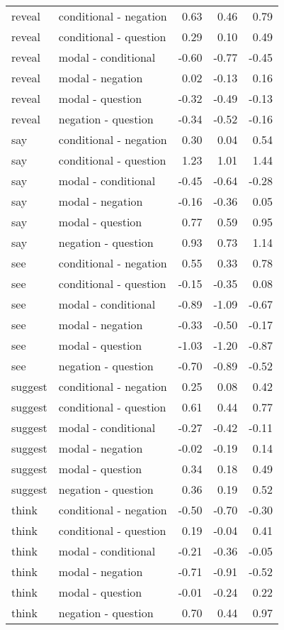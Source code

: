 \documentclass[11pt,fleqn]{article}
\newcommand{\6}{\mbox{$[\hspace*{-.6mm}[$}}
\newcommand{\9}{\mbox{$]\hspace*{-.6mm}]$}}
\begin{document}
\begin{longtable}{llrrr}
      reveal & conditional - negation & 0.63 & 0.46 & 0.79 \\ 
      reveal & conditional - question & 0.29 & 0.10 & 0.49 \\ 
      reveal & modal - conditional & -0.60 & -0.77 & -0.45 \\ 
      reveal & modal - negation & 0.02 & -0.13 & 0.16 \\ 
      reveal & modal - question & -0.32 & -0.49 & -0.13 \\ 
      reveal & negation - question & -0.34 & -0.52 & -0.16 \\ \midrule

      say & conditional - negation & 0.30 & 0.04 & 0.54 \\ 
      say & conditional - question & 1.23 & 1.01 & 1.44 \\ 
      say & modal - conditional & -0.45 & -0.64 & -0.28 \\ 
      say & modal - negation & -0.16 & -0.36 & 0.05 \\ 
      say & modal - question & 0.77 & 0.59 & 0.95 \\ 
      say & negation - question & 0.93 & 0.73 & 1.14 \\ \midrule

      see & conditional - negation & 0.55 & 0.33 & 0.78 \\ 
      see & conditional - question & -0.15 & -0.35 & 0.08 \\ 
      see & modal - conditional & -0.89 & -1.09 & -0.67 \\ 
      see & modal - negation & -0.33 & -0.50 & -0.17 \\ 
      see & modal - question & -1.03 & -1.20 & -0.87 \\ 
      see & negation - question & -0.70 & -0.89 & -0.52 \\ \midrule

      suggest & conditional - negation & 0.25 & 0.08 & 0.42 \\ 
      suggest & conditional - question & 0.61 & 0.44 & 0.77 \\ 
      suggest & modal - conditional & -0.27 & -0.42 & -0.11 \\ 
      suggest & modal - negation & -0.02 & -0.19 & 0.14 \\ 
      suggest & modal - question & 0.34 & 0.18 & 0.49 \\ 
      suggest & negation - question & 0.36 & 0.19 & 0.52 \\ \midrule

      think & conditional - negation & -0.50 & -0.70 & -0.30 \\ 
      think & conditional - question & 0.19 & -0.04 & 0.41 \\ 
      think & modal - conditional & -0.21 & -0.36 & -0.05 \\ 
      think & modal - negation & -0.71 & -0.91 & -0.52 \\ 
      think & modal - question & -0.01 & -0.24 & 0.22 \\ 
      think & negation - question & 0.70 & 0.44 & 0.97 \\ 
      \end{longtable}



\end{document}

